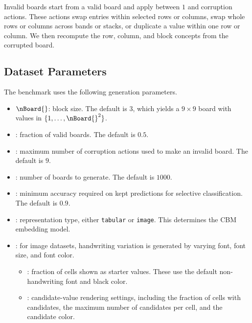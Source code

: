 Invalid boards start from a valid board and apply between $1$ and  corruption actions. These actions swap entries within selected rows or columns, swap whole rows or columns across bands or stacks, or duplicate a value within one row or column. We then recompute the row, column, and block concepts from the corrupted board.

\subsection{Dataset Parameters}
The  benchmark uses the following generation parameters.

\begin{itemize}
    \item $\nBoard{}$: block size. The default is $3$, which yields a $9 \times 9$ board with values in $\{1,\ldots,\nBoard{}^2\}$.
    \item {}: fraction of valid boards. The default is $0.5$.
    \item {}: maximum number of corruption actions used to make an invalid board. The default is $9$.
    \item {}: number of boards to generate. The default is $1000$.
    \item {}: minimum accuracy required on kept predictions for selective classification. The default is $0.9$.
    \item {}: representation type, either \texttt{tabular} or \texttt{image}. This determines the CBM embedding model.
    \item {}: for image datasets, handwriting variation is generated by varying font, font size, and font color.
    \begin{itemize}
        \item {}: fraction of cells shown as starter values. These use the default non-handwriting font and black color.
        \item {}: candidate-value rendering settings, including the fraction of cells with candidates, the maximum number of candidates per cell, and the candidate color.
    \end{itemize}
\end{itemize}

